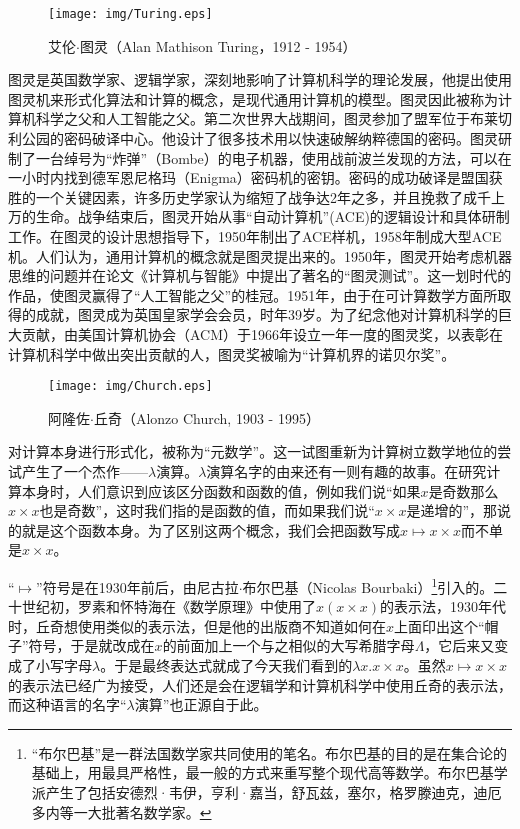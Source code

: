 \documentclass{article}
\begin{document}
\begin{figure}[htbp]
 \centering
 \texttt{[image: img/Turing.eps]}
 \captionsetup{labelformat=empty}
 \caption{艾伦$\cdot$图灵（Alan Mathison Turing，1912 - 1954）}
 \label{fig:Turing}
\end{figure}

图灵是英国数学家、逻辑学家，深刻地影响了计算机科学的理论发展，他提出使用图灵机来形式化算法和计算的概念，是现代通用计算机的模型。图灵因此被称为计算机科学之父和人工智能之父\cite{wiki-Turing}。第二次世界大战期间，图灵参加了盟军位于布莱切利公园的密码破译中心。他设计了很多技术用以快速破解纳粹德国的密码。图灵研制了一台绰号为“炸弹”（Bombe）的电子机器，使用战前波兰发现的方法，可以在一小时内找到德军恩尼格玛（Enigma）密码机的密钥。密码的成功破译是盟国获胜的一个关键因素，许多历史学家认为缩短了战争达2年之多，并且挽救了成千上万的生命。战争结束后，图灵开始从事“自动计算机”(ACE)的逻辑设计和具体研制工作。在图灵的设计思想指导下，1950年制出了ACE样机，1958年制成大型ACE机。人们认为，通用计算机的概念就是图灵提出来的。1950年，图灵开始考虑机器思维的问题并在论文《计算机与智能》中提出了著名的“图灵测试”。这一划时代的作品，使图灵赢得了“人工智能之父”的桂冠。1951年，由于在可计算数学方面所取得的成就，图灵成为英国皇家学会会员，时年39岁。为了纪念他对计算机科学的巨大贡献，由美国计算机协会（ACM）于1966年设立一年一度的图灵奖，以表彰在计算机科学中做出突出贡献的人，图灵奖被喻为“计算机界的诺贝尔奖”。

\begin{wrapfigure}{R}{0.3\textwidth}
 \centering
 \texttt{[image: img/Church.eps]}
 \captionsetup{labelformat=empty}
 \caption{阿隆佐$\cdot$丘奇（Alonzo Church, 1903 - 1995）}
 \label{fig:Church}
\end{wrapfigure}

对计算本身进行形式化，被称为“元数学”。这一试图重新为计算树立数学地位的尝试产生了一个杰作——$\lambda$演算。$\lambda$演算名字的由来还有一则有趣的故事。在研究计算本身时，人们意识到应该区分函数和函数的值，例如我们说“如果$x$是奇数那么$x \times x$也是奇数”，这时我们指的是函数的值，而如果我们说“$x \times x$是递增的”，那说的就是这个函数本身。为了区别这两个概念，我们会把函数写成$x \mapsto x \times x$而不单是$x \times x$。

“$\mapsto$”符号是在1930年前后，由尼古拉$\cdot$布尔巴基（Nicolas Bourbaki）\footnote{“布尔巴基”是一群法国数学家共同使用的笔名。布尔巴基的目的是在集合论的基础上，用最具严格性，最一般的方式来重写整个现代高等数学。布尔巴基学派产生了包括安德烈·韦伊，亨利·嘉当，舒瓦兹，塞尔，格罗滕迪克，迪厄多内等一大批著名数学家。}引入的。二十世纪初，罗素和怀特海在《数学原理》中使用了$\hat{x}(x \times x)$的表示法，1930年代时，丘奇想使用类似的表示法，但是他的出版商不知道如何在$x$上面印出这个“帽子”符号，于是就改成在$x$的前面加上一个与之相似的大写希腊字母$\Lambda$，它后来又变成了小写字母$\lambda$。于是最终表达式就成了今天我们看到的$\lambda x . x \times x$\cite{Dowek2011}。虽然$x \mapsto x \times x$的表示法已经广为接受，人们还是会在逻辑学和计算机科学中使用丘奇的表示法，而这种语言的名字“$\lambda$演算”也正源自于此。
\end{document}
